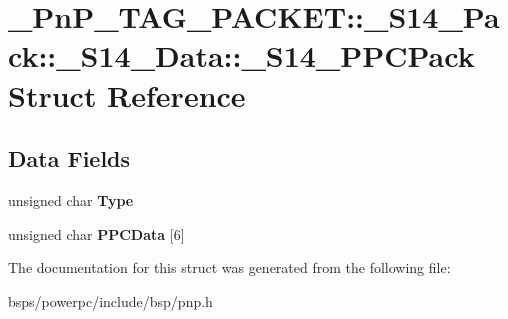 \hypertarget{struct__PnP__TAG__PACKET_1_1__S14__Pack_1_1__S14__Data_1_1__S14__PPCPack}{}\section{\+\_\+\+Pn\+P\+\_\+\+T\+A\+G\+\_\+\+P\+A\+C\+K\+ET\+::\+\_\+\+S14\+\_\+\+Pack\+::\+\_\+\+S14\+\_\+\+Data\+::\+\_\+\+S14\+\_\+\+P\+P\+C\+Pack Struct Reference}
\label{struct__PnP__TAG__PACKET_1_1__S14__Pack_1_1__S14__Data_1_1__S14__PPCPack}
\subsection*{Data Fields}
\begin{DoxyCompactItemize}
\item 
\mbox{\label{struct__PnP__TAG__PACKET_1_1__S14__Pack_1_1__S14__Data_1_1__S14__PPCPack_a39ab460fd7b18df3b412eeaa821822ee}} 
unsigned char {\bfseries Type}
\item 
\mbox{\label{struct__PnP__TAG__PACKET_1_1__S14__Pack_1_1__S14__Data_1_1__S14__PPCPack_a9ed172f2f41b348f2a2bac453309be66}} 
unsigned char {\bfseries P\+P\+C\+Data} \mbox{[}6\mbox{]}
\end{DoxyCompactItemize}


The documentation for this struct was generated from the following file\+:\begin{DoxyCompactItemize}
\item 
bsps/powerpc/include/bsp/pnp.\+h\end{DoxyCompactItemize}

